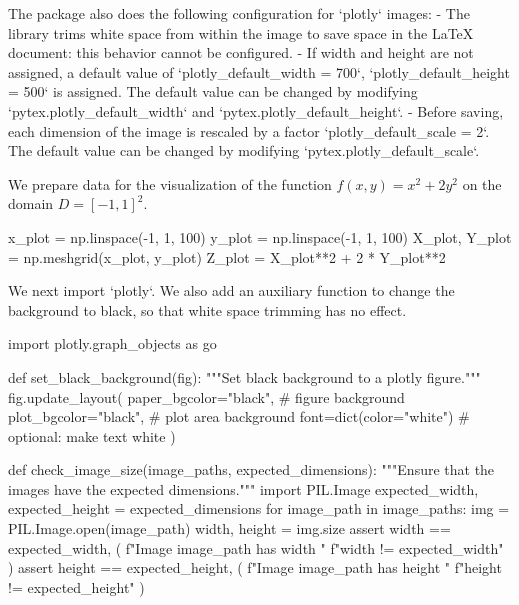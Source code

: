 \documentclass[oneside]{book}
\begin{document}
\begin{mdcell}
The package also does the following configuration for `plotly` images:
- The library trims white space from within the image to save space in the LaTeX document: this behavior cannot be configured.
- If width and height are not assigned, a default value of `plotly_default_width = 700`, `plotly_default_height = 500` is assigned. The default value can be changed by modifying `pytex.plotly_default_width` and `pytex.plotly_default_height`.
- Before saving, each dimension of the image is rescaled by a factor `plotly_default_scale = 2`. The default value can be changed by modifying `pytex.plotly_default_scale`.
\end{mdcell}

\begin{mdcell}
We prepare data for the visualization of the function $f(x, y) = x^2 + 2 y^2$ on the domain $D = [-1, 1]^2$.
\end{mdcell}

\begin{pycell}
x_plot = np.linspace(-1, 1, 100)
y_plot = np.linspace(-1, 1, 100)
X_plot, Y_plot = np.meshgrid(x_plot, y_plot)
Z_plot = X_plot**2 + 2 * Y_plot**2
\end{pycell}

\begin{mdcell}
We next import `plotly`. We also add an auxiliary function to change the background to black, so that white space trimming has no effect.
\end{mdcell}

\begin{pycell}
import plotly.graph_objects as go
\end{pycell}

\begin{pycell}
def set_black_background(fig):
    """Set black background to a plotly figure."""
    fig.update_layout(
        paper_bgcolor="black",   # figure background
        plot_bgcolor="black",    # plot area background
        font=dict(color="white") # optional: make text white
    )
\end{pycell}

\begin{pycell}
def check_image_size(image_paths, expected_dimensions):
    """Ensure that the images have the expected dimensions."""
    import PIL.Image
    expected_width, expected_height = expected_dimensions
    for image_path in image_paths:
        img = PIL.Image.open(image_path)
        width, height = img.size
        assert width == expected_width, (
            f"Image {image_path} has width "
            f"{width} != {expected_width}"
        )
        assert height == expected_height, (
            f"Image {image_path} has height "
            f"{height} != {expected_height}"
        )
\end{pycell}
\end{document}
